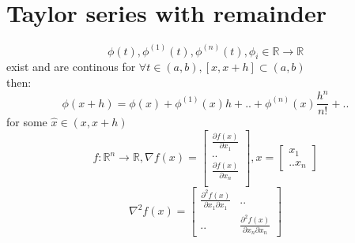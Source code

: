 \documentclass[12pt,letter]{article}
\newcommand{\R}{\mathbb{R}}
\newcommand{\ppartial}[2]{\frac{\partial #1}{\partial #2}}
\newcommand{\p}{\partial}
\begin{document}

\section{Taylor series with remainder}
  \[\phi(t), \phi^{(1)}(t), \phi^{(n)}(t), \phi_i \in \R\to\R \]
  exist and are continous for $\forall t \in(a,b),[x,x+h]\subset (a,b)$\\
  then:
  \[\phi(x+h) = \phi(x) + \phi^{(1)}(x)h + .. + \phi^{(n)}(x) \frac{h^n}{n!} + ..\]
  for some $\hat{x}\in(x,x+h)$\\
  \[
    f:\R^n \to \R,
    \nabla f(x) =
    \begin{bmatrix}
      \ppartial{f(x)}{x_1} \\
      ..\\
      \ppartial{f(x)}{x_n} \\
    \end{bmatrix},
    x =
    \begin{bmatrix}
      x_1\\ .. x_n
    \end{bmatrix}
  \]
  \[
    \nabla^2 f(x) =
    \begin{bmatrix}
      \frac{\p^2 f(x)}{\p x_1 \p x_1} & .. \\
      .. & \frac{\p^2 f(x)}{\p x_n \p x_n}
    \end{bmatrix}
  \]
  
\end{document}
